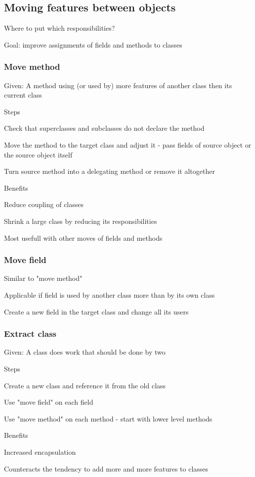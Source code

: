 \subsection{Moving features between objects}
\enumstart
	\item Where to put which responsibilities?
	\item Goal: improve assignments of fields and methods to classes
\enumend

\subsubsection{Move method}
\enumstart
	\item Given: A method using (or used by) more features of another class then its current class
	\item Steps
	\enumstart
		\item Check that superclasses and subclasses do not declare the method
		\item Move the method to the target class and adjust it - pass fields of source object or the source object itself
		\item Turn source method into a delegating method or remove it altogether
	\enumend
	\item Benefits
	\enumstart
		\item Reduce coupling of classes
		\item Shrink a large class by reducing its responsibilities
		\item Most usefull with other moves of fields and methods
	\enumend
\enumend

\subsubsection{Move field}
\enumstart
	\item Similar to "move method"
	\item Applicable if field is used by another class more than by its own class
	\item Create a new field in the target class and change all its users
\enumend

\subsubsection{Extract class}
\enumstart
	\item Given: A class does work that should be done by two
	\item Steps
	\enumstart
		\item Create a new class and reference it from the old class
		\item Use "move field" on each field
		\item Use "move method" on each method - start with lower level methods
	\enumend
	\item Benefits
	\enumstart
		\item Increased encapsulation
		\item Counteracts the tendency to add more and more features to classes
	\enumend
\enumend

